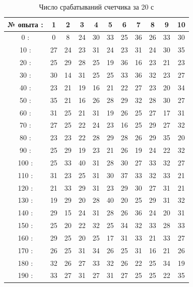 \documentclass[a4paper,12pt]{article}
\begin{document}
\begin{table}[H]
\centering
\caption{Число срабатываний счетчика за 20 с}
\begin{tabular}{|c|c|c|c|c|c|c|c|c|c|c|}
\hline
№ опыта : & 1 & 2 & 3 & 4 & 5 & 6 & 7 & 8 & 9 & 10 \\
\hline
0 : & 0 & 8 & 24 & 30 & 33 & 25 & 36 & 26 & 33 & 30 \\
10 : & 27 & 24 & 23 & 31 & 24 & 23 & 31 & 24 & 30 & 35 \\
20 : & 25 & 29 & 28 & 25 & 19 & 36 & 16 & 23 & 21 & 23 \\
30 : & 30 & 14 & 31 & 25 & 25 & 33 & 36 & 32 & 23 & 27 \\
40 : & 23 & 21 & 19 & 16 & 21 & 22 & 27 & 23 & 20 & 34 \\
50 : & 35 & 21 & 16 & 26 & 28 & 29 & 32 & 28 & 30 & 27 \\
60 : & 31 & 25 & 21 & 31 & 19 & 26 & 25 & 27 & 17 & 31 \\
70 : & 27 & 25 & 22 & 24 & 23 & 16 & 25 & 29 & 27 & 32 \\
80 : & 23 & 23 & 22 & 28 & 29 & 28 & 26 & 29 & 35 & 20 \\
90 : & 25 & 29 & 19 & 23 & 21 & 26 & 19 & 24 & 22 & 32 \\
100 : & 25 & 33 & 40 & 31 & 28 & 30 & 27 & 33 & 32 & 27 \\
110 : & 31 & 23 & 25 & 31 & 30 & 37 & 33 & 32 & 33 & 21 \\
120 : & 21 & 33 & 29 & 31 & 23 & 29 & 30 & 27 & 31 & 21 \\
130 : & 19 & 29 & 20 & 28 & 40 & 20 & 25 & 29 & 31 & 32 \\
140 : & 29 & 15 & 24 & 31 & 28 & 26 & 36 & 24 & 20 & 31 \\
150 : & 25 & 20 & 22 & 32 & 25 & 34 & 32 & 33 & 28 & 33 \\
160 : & 29 & 25 & 20 & 25 & 17 & 31 & 33 & 21 & 33 & 27 \\
170 : & 26 & 25 & 31 & 34 & 26 & 25 & 31 & 16 & 21 & 26 \\
180 : & 32 & 26 & 27 & 33 & 32 & 26 & 22 & 25 & 34 & 19 \\
190 : & 33 & 27 & 31 & 27 & 31 & 27 & 25 & 25 & 22 & 35 \\
\hline
\end{tabular}
\end{table}
\end{document}
